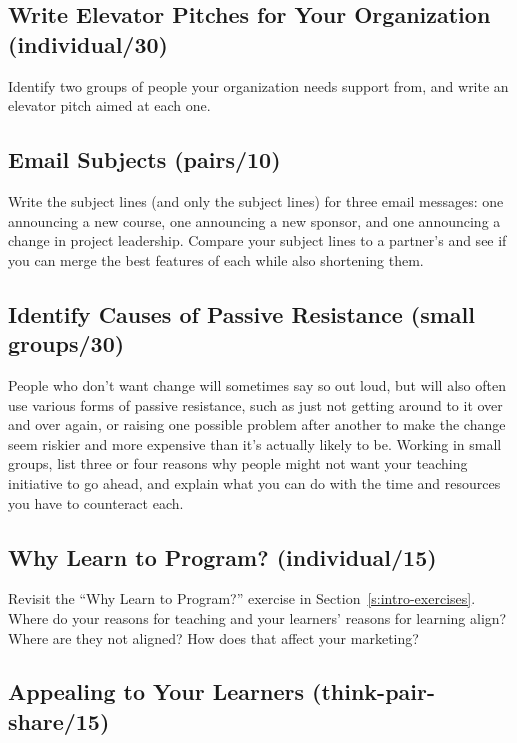 \subsection*{Write Elevator Pitches for Your Organization (individual/30)}

Identify two groups of people your organization needs support from, and
write an elevator pitch aimed at each one.

\subsection*{Email Subjects (pairs/10)}

Write the subject lines (and only the subject lines) for three email
messages: one announcing a new course, one announcing a new sponsor, and
one announcing a change in project leadership. Compare your subject
lines to a partner's and see if you can merge the best features of each
while also shortening them.

\subsection*{Identify Causes of Passive Resistance (small groups/30)}

People who don't want change will sometimes say so out loud, but will
also often use various forms of passive resistance, such as just not
getting around to it over and over again, or raising one possible
problem after another to make the change seem riskier and more expensive
than it's actually likely to be. Working in small groups, list three or
four reasons why people might not want your teaching initiative to go
ahead, and explain what you can do with the time and resources you have
to counteract each.

\subsection*{Why Learn to Program? (individual/15)}

Revisit the ``Why Learn to Program?'' exercise in
Section~\ref{s:intro-exercises}. Where do your reasons for teaching and
your learners' reasons for learning align? Where are they not aligned?
How does that affect your marketing?

\subsection*{Appealing to Your Learners (think-pair-share/15)}

